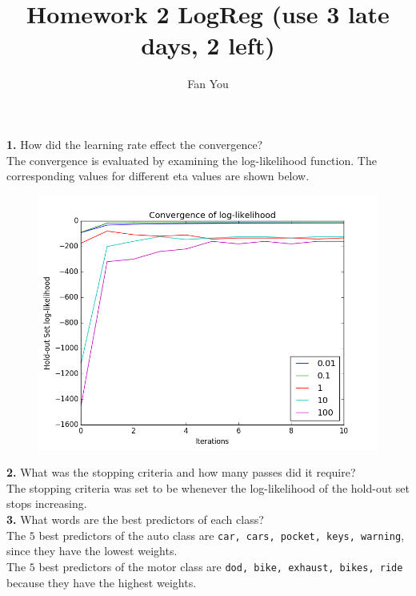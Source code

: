 \documentclass[12pt]{article}
\begin{document}
 
\title{Homework 2 LogReg (use 3 late days, 2 left)}
\date{}
\author{Fan You}
\maketitle

\textbf{1.} How did the learning rate effect the convergence?\\

The convergence is evaluated by examining the log-likelihood function. The corresponding values for different eta values are shown below.
	\begin{figure}[H]
		\centering
		\includegraphics[scale = 0.35]{q1.png}
	\end{figure}

\textbf{2.} What was the stopping criteria and how many passes did it require?\\

The stopping criteria was set to be whenever the log-likelihood of the hold-out set stops increasing. \\

\textbf{3.} What words are the best predictors of each class?\\

The $5$ best predictors of the auto class are \texttt{car, cars, pocket, keys, warning}, since they have the lowest weights.\\

The $5$ best predictors of the motor class are \texttt{dod, bike, exhaust, bikes, ride} because they have the highest weights.\\
\end{document}

